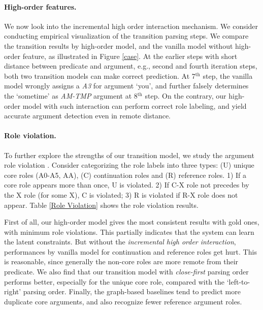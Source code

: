 \documentclass[letterpaper]{article} \usepackage{aaai21}  \usepackage{times}  \usepackage{helvet} \usepackage{courier}  \usepackage[hyphens]{url}  \usepackage{graphicx} \urlstyle{rm} \def\UrlFont{\rm}  \usepackage{natbib}  \usepackage{caption}
\begin{document}
\begin{CJK}{UTF8}{gbsn}
\paragraph{High-order features.}

We now look into the incremental high order interaction mechanism.
We consider conducting empirical visualization of the transition parsing steps.
We compare the transition results by high-order model, and the vanilla model without high-order feature, as illustrated in Figure \ref{case}.
At the earlier steps with short distance between predicate and argument, e.g., second and fourth iteration steps, both two transition models can make correct prediction.
At 7$^{\text{th}}$ step, the vanilla model wrongly assigns a \emph{A3} for argument `you', and further falsely determines the `sometime' as \emph{AM-TMP} argument at 8$^{\text{th}}$ step.
On the contrary, our high-order model with such interaction can perform correct role labeling, and yield accurate argument detection even in remote distance.







\paragraph{Role violation.}

To further explore the strengths of our transition model, we study the argument role violation \cite{punyakanok-etal-2004-semantic,fitzgerald-etal-2015-semantic,he-etal-2018-jointly}.
Consider categorizing the role labels into three types: (U) unique core roles (A0-A5, AA), (C) continuation roles and (R) reference roles.
1) If a core role appears more than once, U is violated.
2) If C-X role not precedes by the X role (for some X), C is violated;
3) R is violated if R-X role does not appear.
Table \ref{Role Violation} shows the role violation results.



First of all, our high-order model gives the most consistent results with gold ones, with minimum role violations.
This partially indicates that the system can learn the latent constraints.
But without the \emph{incremental high order interaction}, performances by vanilla model for continuation and reference roles get hurt.
This is reasonable, since generally the non-core roles are more remote from their predicate.
We also find that our transition model with \emph{close-first} parsing order performs better, especially for the unique core role, compared with the `left-to-right' parsing order.
Finally, the graph-based baselines tend to predict more duplicate core arguments, and also recognize fewer reference argument roles.










\end{CJK}
\end{document}

